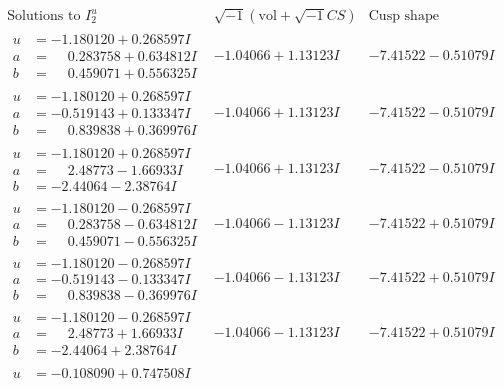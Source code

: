 \documentclass[1p]{elsarticle_modified}
\theoremstyle{definition}
\newcommand{\I}{\sqrt{-1}}
\begin{document}
$$\begin{array}{c|c|c}  
\text{Solutions to }I^u_{2}& \I (\text{vol} + \sqrt{-1}CS) & \text{Cusp shape}\\
 \hline 
\begin{aligned}
u &= -1.180120 + 0.268597 I \\
a &= \phantom{-}0.283758 + 0.634812 I \\
b &= \phantom{-}0.459071 + 0.556325 I\end{aligned}
 & -1.04066 + 1.13123 I & -7.41522 - 0.51079 I \\ \hline\begin{aligned}
u &= -1.180120 + 0.268597 I \\
a &= -0.519143 + 0.133347 I \\
b &= \phantom{-}0.839838 + 0.369976 I\end{aligned}
 & -1.04066 + 1.13123 I & -7.41522 - 0.51079 I \\ \hline\begin{aligned}
u &= -1.180120 + 0.268597 I \\
a &= \phantom{-}2.48773 - 1.66933 I \\
b &= -2.44064 - 2.38764 I\end{aligned}
 & -1.04066 + 1.13123 I & -7.41522 - 0.51079 I \\ \hline\begin{aligned}
u &= -1.180120 - 0.268597 I \\
a &= \phantom{-}0.283758 - 0.634812 I \\
b &= \phantom{-}0.459071 - 0.556325 I\end{aligned}
 & -1.04066 - 1.13123 I & -7.41522 + 0.51079 I \\ \hline\begin{aligned}
u &= -1.180120 - 0.268597 I \\
a &= -0.519143 - 0.133347 I \\
b &= \phantom{-}0.839838 - 0.369976 I\end{aligned}
 & -1.04066 - 1.13123 I & -7.41522 + 0.51079 I \\ \hline\begin{aligned}
u &= -1.180120 - 0.268597 I \\
a &= \phantom{-}2.48773 + 1.66933 I \\
b &= -2.44064 + 2.38764 I\end{aligned}
 & -1.04066 - 1.13123 I & -7.41522 + 0.51079 I \\ \hline\begin{aligned}
u &= -0.108090 + 0.747508 I \\

\end{aligned}
\end{array}$$
\end{document}
